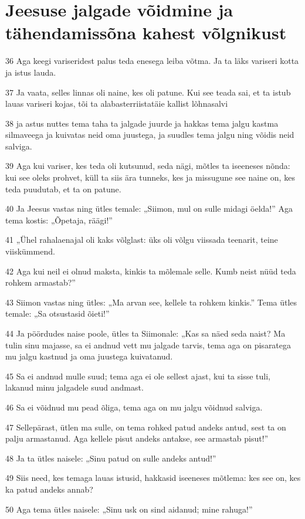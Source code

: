 \section*{Jeesuse jalgade võidmine ja tähendamissõna kahest võlgnikust}

\par 36 Aga keegi variseridest palus teda enesega leiba võtma. Ja ta läks variseri kotta ja istus lauda.
\par 37 Ja vaata, selles linnas oli naine, kes oli patune. Kui see teada sai, et ta istub lauas variseri kojas, tõi ta alabasterriistatäie kallist lõhnasalvi
\par 38 ja astus nuttes tema taha ta jalgade juurde ja hakkas tema jalgu kastma silmaveega ja kuivatas neid oma juustega, ja suudles tema jalgu ning võidis neid salviga.
\par 39 Aga kui variser, kes teda oli kutsunud, seda nägi, mõtles ta iseeneses nõnda: kui see oleks prohvet, küll ta siis ära tunneks, kes ja missugune see naine on, kes teda puudutab, et ta on patune.
\par 40 Ja Jeesus vastas ning ütles temale: „Siimon, mul on sulle midagi öelda!” Aga tema kostis: „Õpetaja, räägi!”
\par 41 „Ühel rahalaenajal oli kaks võlglast: üks oli võlgu viissada teenarit, teine viiskümmend.
\par 42 Aga kui neil ei olnud maksta, kinkis ta mõlemale selle. Kumb neist nüüd teda rohkem armastab?”
\par 43 Siimon vastas ning ütles: „Ma arvan see, kellele ta rohkem kinkis.” Tema ütles temale: „Sa otsustasid õieti!”
\par 44 Ja pöördudes naise poole, ütles ta Siimonale: „Kas sa näed seda naist? Ma tulin sinu majasse, sa ei andnud vett mu jalgade tarvis, tema aga on pisaratega mu jalgu kastnud ja oma juustega kuivatanud.
\par 45 Sa ei andnud mulle suud; tema aga ei ole sellest ajast, kui ta sisse tuli, lakanud minu jalgadele suud andmast.
\par 46 Sa ei võidnud mu pead õliga, tema aga on mu jalgu võidnud salviga.
\par 47 Sellepärast, ütlen ma sulle, on tema rohked patud andeks antud, sest ta on palju armastanud. Aga kellele pisut andeks antakse, see armastab pisut!”
\par 48 Ja ta ütles naisele: „Sinu patud on sulle andeks antud!”
\par 49 Siis need, kes temaga lauas istusid, hakkasid iseeneses mõtlema: kes see on, kes ka patud andeks annab?
\par 50 Aga tema ütles naisele: „Sinu usk on sind aidanud; mine rahuga!”


